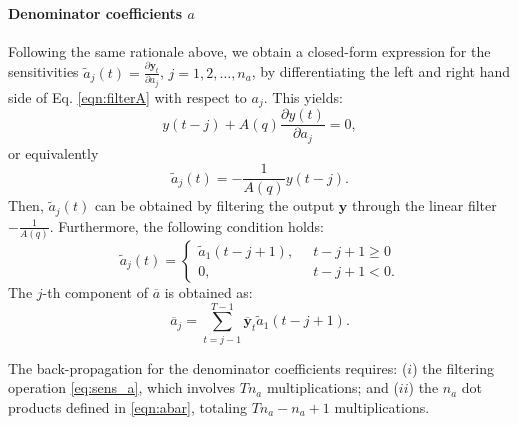 \documentclass{article}
\newcommand{\q}{q} %
\newcommand{\A}{A} %
\newcommand{\ac}{a} %
\newcommand{\sens}[1]{\tilde{#1}}
\newcommand{\adjoint}[1]{\overline{#1}}
\newcommand{\tvec}[1]{\mathbf{#1}}
\newcommand{\nsamp}{T}
\newcommand{\pdiff}[2]{\frac{\partial #1}{\partial #2}}
\begin{document}
\paragraph{Denominator coefficients $\ac$}
Following the same rationale above, we obtain a closed-form expression for the sensitivities $\sens{\ac}_j(t) = \pdiff{\tvec{y}_t}{\ac_j}$, $j=1,2,\dots,n_\ac$, %
by differentiating the left and right hand side of Eq. \eqref{eqn:filterA} with respect to $\ac_j$. This yields:
\begin{equation*}
y(t-j) + \A(\q) \pdiff{y(t)}{\ac_j} = 0,
\end{equation*}
or equivalently
\begin{equation}
\label{eq:sens_a}
\sens{\ac}_j(t) = -\frac{1}{\A(\q)}y(t-j).
\end{equation}
Then, $\sens{\ac}_j(t)$ can be obtained by filtering the output $\tvec{y}$ through the linear filter $-\frac{1}{\A(\q)}$. Furthermore, the following condition holds:
\begin{equation}
\label{eq:regime_a2}
\sens{\ac}_{j}(t) = \begin{cases}
\sens{\ac}_1(t-j+1), \;\;&t-j+1 \geq 0\\
0,           \;\; & t-j+1 < 0.
\end{cases}
\end{equation}
The $j$-th component of $\adjoint{\ac}$ is obtained as: %
\begin{equation} \label{eqn:abar}
\adjoint{\ac}_j = \sum_{t=j-1}^{\nsamp-1} \adjoint{\tvec{y}}_t \sens{a}_1(t-j+1).
\end{equation}


The back-propagation for the denominator coefficients requires: ($i$) the  filtering operation \eqref{eq:sens_a}, which involves  $\nsamp n_\ac$ multiplications; and ($ii$) 
the $n_\ac$ dot products defined in \eqref{eqn:abar}, totaling $\nsamp n_\ac - n_\ac + 1$ multiplications. 
\end{document}
